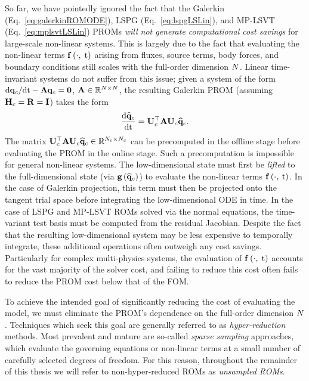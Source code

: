 So far, we have pointedly ignored the fact that the Galerkin (Eq.~\ref{eq:galerkinROMODE}), LSPG (Eq.~\ref{eq:lspgLSLin}), and MP-LSVT (Eq.~\ref{eq:mplsvtLSLin}) PROMs \textit{will not generate computational cost savings} for large-scale non-linear systems. This is largely due to the fact that evaluating the non-linear terms $\mathbf{f} \left(\cdot, \; \text{t}\right)$ arising from fluxes, source terms, body forces, and boundary conditions still scales with the full-order dimension $N$. Linear time-invariant systems do not suffer from this issue; given a system of the form $\text{d}\mathbf{q}_{c}/\text{d}\text{t} - \mathbf{A} \mathbf{q}_{c} = \mathbf{0}$, $\mathbf{A} \in \mathbb{R}^{N \times N}$, the resulting Galerkin PROM (assuming $\consScale = \resScale = \identMat$) takes the form
%
\begin{equation}
    \ode{\consVecCoef}{\timeVar} = \consTrial^\top \dummyMat \consTrial \consVecCoef.
\end{equation}
%
The matrix $\consTrial^\top \dummyMat \consTrial \consVecCoef \inRTwo{\numConsModes}{\numConsModes}$ can be precomputed in the offline stage before evaluating the PROM in the online stage. Such a precomputation is impossible for general non-linear systems. The low-dimensional state must first be \textit{lifted} to the full-dimensional state (via $\mathbf{g} \left(\mathbf{\widehat{q}}_{c}\right)$) to evaluate the non-linear terms $\mathbf{f} \left(\cdot, \; \text{t}\right)$. In the case of Galerkin projection, this term must then be projected onto the tangent trial space before integrating the low-dimensional ODE in time. In the case of LSPG and MP-LSVT ROMs solved via the normal equations, the time-variant test basis must be computed from the residual Jacobian. Despite the fact that the resulting low-dimensional system may be less expensive to temporally integrate, these additional operations often outweigh any cost savings. Particularly for complex multi-physics systems, the evaluation of $\mathbf{f} \left(\cdot, \; \text{t}\right)$ accounts for the vast majority of the solver cost, and failing to reduce this cost often fails to reduce the PROM cost below that of the FOM.

To achieve the intended goal of significantly reducing the cost of evaluating the model, we must eliminate the PROM's dependence on the full-order dimension $N$. Techniques which seek this goal are generally referred to as \textit{hyper-reduction} methods. Most prevalent and mature are so-called \textit{sparse sampling} approaches, which evaluate the governing equations or non-linear terms at a small number of carefully selected degrees of freedom. For this reason, throughout the remainder of this thesis we will refer to non-hyper-reduced ROMs as \textit{unsampled ROMs}.

